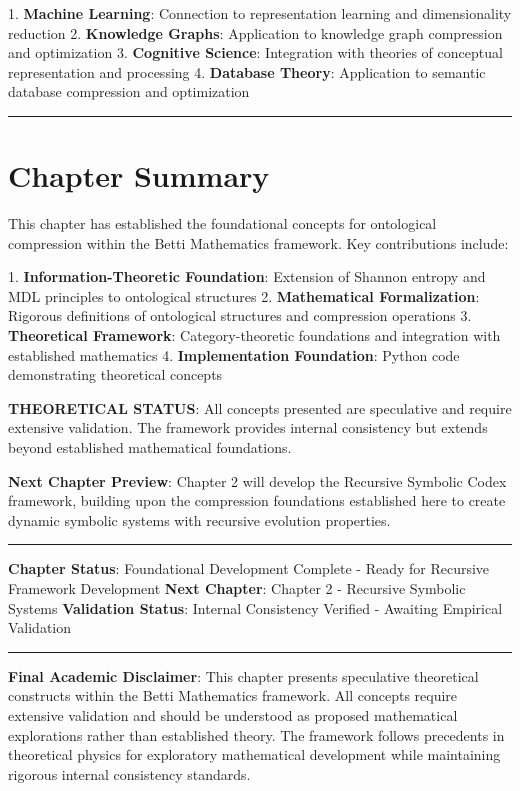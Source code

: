 1. \textbf{Machine Learning}: Connection to representation learning and dimensionality reduction
2. \textbf{Knowledge Graphs}: Application to knowledge graph compression and optimization
3. \textbf{Cognitive Science}: Integration with theories of conceptual representation and processing
4. \textbf{Database Theory}: Application to semantic database compression and optimization

\hrule

\section{Chapter Summary}

This chapter has established the foundational concepts for ontological compression within the Betti Mathematics framework. Key contributions include:

1. \textbf{Information-Theoretic Foundation}: Extension of Shannon entropy and MDL principles to ontological structures
2. \textbf{Mathematical Formalization}: Rigorous definitions of ontological structures and compression operations
3. \textbf{Theoretical Framework}: Category-theoretic foundations and integration with established mathematics
4. \textbf{Implementation Foundation}: Python code demonstrating theoretical concepts

\textbf{THEORETICAL STATUS}: All concepts presented are speculative and require extensive validation. The framework provides internal consistency but extends beyond established mathematical foundations.

\textbf{Next Chapter Preview}: Chapter 2 will develop the Recursive Symbolic Codex framework, building upon the compression foundations established here to create dynamic symbolic systems with recursive evolution properties.

\hrule

\textbf{Chapter Status}: Foundational Development Complete - Ready for Recursive Framework Development  
\textbf{Next Chapter}: Chapter 2 - Recursive Symbolic Systems  
\textbf{Validation Status}: Internal Consistency Verified - Awaiting Empirical Validation

\hrule

\textbf{Final Academic Disclaimer}: This chapter presents speculative theoretical constructs within the Betti Mathematics framework. All concepts require extensive validation and should be understood as proposed mathematical explorations rather than established theory. The framework follows precedents in theoretical physics for exploratory mathematical development while maintaining rigorous internal consistency standards.